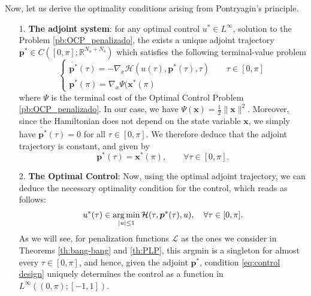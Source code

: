 \documentclass[twocolumn]{autart}    %
\begin{document}
Now, let us derive the optimality conditions arising from Pontryagin's principle.
\begin{itemize}
    \item[1.] \textbf{The adjoint system}: for any optimal control $u^\ast \in L^\infty$, solution to the Problem \ref{pb:OCP_penalizado}, the exists a unique adjoint trajectory
    $\bm{p}^\ast\in C([0,\pi]; \mathbb{R}^{N_a+N_b})$ which satisfies the following terminal-value problem
    \begin{equation*}
    \left\{ \begin{array}{l}
    	\dot{\bm{p}^\ast}(\tau) = -\nabla_x \mathcal{H}(u(\tau),\bm{p}^\ast(\tau),\tau)
    	\qquad \tau \in [0,\pi] \\
    	\bm{p}^\ast (\pi) = \nabla_x \Psi (\bm{x}^\ast (\pi)
    	\end{array}\right.
    \end{equation*}
    where $\Psi$ is the terminal cost of the Optimal Control Problem \ref{pb:OCP_penalizado}.
    In our case,  we have $\Psi (\bm{x}) = \frac{1}{2} \| \bm{x}\|^2$.
   Moreover,  since the Hamiltonian does not depend on the state variable $\bm{x}$, we simply have  $\dot{\bm{p}^\ast}(\tau) = 0$ for all $\tau \in [0,\pi]$.
We therefore deduce that the adjoint trajectory is constant, and given by
\begin{equation}\label{eq:adjoint constant}
\bm{p}^\ast (\tau) = \bm{x}^\ast (\pi), \qquad \forall \tau \in [0,\pi]. 
\end{equation}
    
    \item[2.] \textbf{The Optimal  Control}: Now, using the optimal adjoint trajectory, we can deduce the necessary optimality condition for the control, which reads as follows:
    \begin{align}\label{eq:control design}
    	u^* (\tau) \in \operatorname*{arg\,min}_{|u|\leq 1} \mathcal{H}(\tau,\bm{p}^*(\tau),u), \quad \forall \tau \in [0,\pi].
    \end{align}
    As we will see, for penalization functions $\mathcal{L}$ as the ones we consider in Theorems \ref{th:bang-bang} and \ref{th:PLP}, this argmin is a singleton for almost every $\tau\in [0,\pi]$, and hence, given the adjoint $\bm{p}^\ast$,  condition \eqref{eq:control design} uniquely determines the control as a function in $L^\infty((0,\pi);[-1,1])$.
    	
\end{itemize}
    
\end{document}
